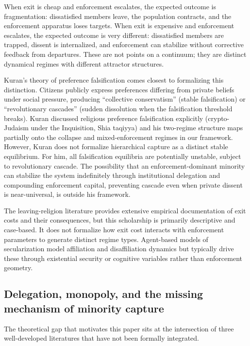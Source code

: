 \documentclass[12pt]{article}
\begin{document}
When exit is cheap and enforcement escalates, the expected outcome is fragmentation: dissatisfied members leave, the population contracts, and the enforcement apparatus loses targets. When exit is expensive and enforcement escalates, the expected outcome is very different: dissatisfied members are trapped, dissent is internalized, and enforcement can stabilize without corrective feedback from departures. These are not points on a continuum; they are distinct dynamical regimes with different attractor structures.

Kuran's \cite{kuran1995} theory of preference falsification comes closest to formalizing this distinction. Citizens publicly express preferences differing from private beliefs under social pressure, producing ``collective conservatism'' (stable falsification) or ``revolutionary cascades'' (sudden dissolution when the falsification threshold breaks). Kuran discussed religious preference falsification explicitly (crypto-Judaism under the Inquisition, Shia taqiyya) and his two-regime structure maps partially onto the collapse and mixed-enforcement regimes in our framework. However, Kuran does not formalize hierarchical capture as a distinct stable equilibrium. For him, all falsification equilibria are potentially unstable, subject to revolutionary cascade. The possibility that an enforcement-dominant minority can stabilize the system indefinitely through institutional delegation and compounding enforcement capital, preventing cascade even when private dissent is near-universal, is outside his framework.

The leaving-religion literature \cite{bromley1998,cragun2011,streib2009} provides extensive empirical documentation of exit costs and their consequences, but this scholarship is primarily descriptive and case-based. It does not formalize how exit cost interacts with enforcement parameters to generate distinct regime types. Agent-based models of secularization \cite{gelfand2011,norenzayan2013} model affiliation and disaffiliation dynamics but typically drive these through existential security or cognitive variables rather than enforcement geometry.

\subsection{Delegation, monopoly, and the missing mechanism of minority capture}

The theoretical gap that motivates this paper sits at the intersection of three well-developed literatures that have not been formally integrated.
\end{document}
